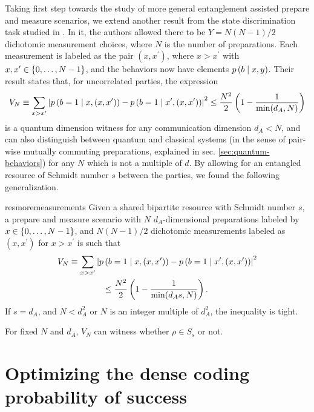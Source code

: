         Taking first step towards the study of more general entanglement assisted prepare and measure scenarios, we extend another result from the state discrimination task studied in \cite{brunner_dimension_2013}. In it, the authors allowed there to be $Y = N (N-1)/2$ dichotomic measurement choices, where $N$ is the number of preparations. Each measurement is labeled as the pair $(x, x^\prime)$, where $x > x^\prime$ with $x, x^\prime \in \{ 0, \ldots, N-1 \}$, and the behaviors now have elements $p \left( b \mid x,y \right)$. Their result states that, for uncorrelated parties, the expression
        $$
            V_N \equiv \sum_{x > x^\prime} \abs{ p \left( b=1 \mid x, (x, x^\prime) \right) - p \left( b=1 \mid x^\prime, (x, x^\prime) \right) }^2 \leq \frac{N^2}{2} \left( 1 - \frac{1}{\min(d_A,N)} \right)
        $$
        is a quantum dimension witness for any communication dimension $d_A < N$, and can also distinguish between quantum and classical systems (in the sense of pair-wise mutually commuting preparations, explained in sec. \ref{sec:quantum-behaviors}) for any $N$ which is not a multiple of $d$. By allowing for an entangled resource of Schmidt number $s$ between the parties, we found the following generalization.
        
        \begin{restatable}{res}{moremeasurements}
            Given a shared bipartite resource with Schmidt number $s$, a prepare and measure scenario with $N$ $d_A$-dimensional preparations labeled by $x \in \{ 0, \ldots, N-1 \}$, and $N (N-1)/2$ dichotomic measurements labeled as $(x, x^\prime)$ for $x > x^\prime$ is such that
            \begin{align*}
                V_N &\equiv \sum_{x > x^\prime} \abs{ p \left( b=1 \mid x, (x, x^\prime) \right) - p \left( b=1 \mid x^\prime, (x, x^\prime) \right) }^2 \\
                &\qquad\qquad\leq \frac{N^2}{2} \left( 1 - \frac{1}{\min(d_A s,N)} \right) .
            \end{align*}
            If $s = d_A$, and $N < d_A^2$ or $N$ is an integer multiple of $d_A^2$, the inequality is tight.
            \label{res:more-measurements}
        \end{restatable}
        
        For fixed $N$ and $d_A$, $V_N$ can witness whether $\rho \in S_s$ or not.
    

    \section{Optimizing the dense coding probability of success}
    \label{sec:pam-quantum-optimization}

